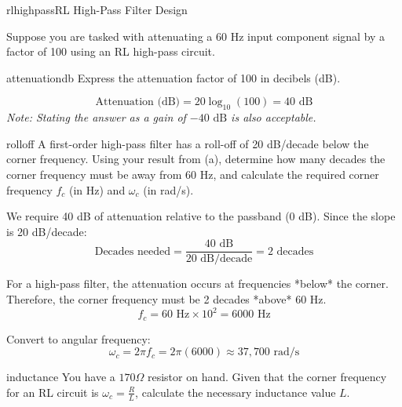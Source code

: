 \begin{mainquestion}{rlhighpass}{RL High-Pass Filter Design}

\questionpoints
Suppose you are tasked with attenuating a 60 Hz input component signal by a factor of 100 using an RL high-pass circuit.

\begin{partquestion}{attenuationdb}
{Express the attenuation factor of 100 in decibels (dB).}

\begin{answer}[0.75in]
        \[\text{Attenuation (dB)} = 20 \log_{10}(100) = 40 \text{ dB}\]
        \textit{Note: Stating the answer as a gain of $-40 \text{ dB}$ is also acceptable.}
\end{answer}

\end{partquestion}

\begin{partquestion}{rolloff}
{A first-order high-pass filter has a roll-off of 20 dB/decade below the corner frequency. Using your result from (a), determine how many decades the corner frequency must be away from 60 Hz, and calculate the required corner frequency $f_c$ (in Hz) and $\omega_c$ (in rad/s).}

\begin{answer}[1.5in]
        We require 40 dB of attenuation relative to the passband (0 dB).
        Since the slope is 20 dB/decade:
        \[\text{Decades needed} = \frac{40 \text{ dB}}{20 \text{ dB/decade}} = 2 \text{ decades}\]
        
        For a high-pass filter, the attenuation occurs at frequencies *below* the corner. Therefore, the corner frequency must be 2 decades *above* 60 Hz.
        \[f_c = 60 \text{ Hz} \times 10^2 = 6000 \text{ Hz}\]
        
        Convert to angular frequency:
        \[\omega_c = 2\pi f_c = 2\pi (6000) \approx 37,700 \text{ rad/s}\]
\end{answer}

\end{partquestion}

\begin{partquestion}{inductance}
{You have a $170\Omega$ resistor on hand. Given that the corner frequency for an RL circuit is $\omega_c = \frac{R}{L}$, calculate the necessary inductance value $L$.}


\end{partquestion}
\end{mainquestion}
